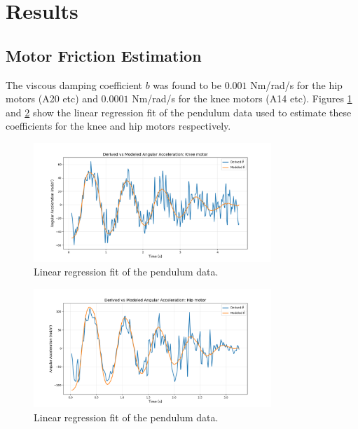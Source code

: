\section{Results}

\subsection{Motor Friction Estimation}
The viscous damping coefficient \( b \) was found to be \( 0.001 \) Nm/rad/s for the hip motors (A20 etc) and \( 0.0001 \) Nm/rad/s for the knee motors (A14 etc). Figures \ref{fig:results:motor_friction_estimation:linear_regression_knee_motor} and \ref{fig:results:motor_friction_estimation:linear_regression_hip_motor} show the linear regression fit of the pendulum data used to estimate these coefficients for the knee and hip motors respectively.

\begin{figure}[h]
    \centering
    \includegraphics[width=0.8\textwidth]{Images/results/friction_est_knee_motor.png}
    \caption{Linear regression fit of the pendulum data. }
    \label{fig:results:motor_friction_estimation:linear_regression_knee_motor}
\end{figure}

\begin{figure}[h]
    \centering
    \includegraphics[width=0.8\textwidth]{Images/results/friction_est_hip_motor.png}
    \caption{Linear regression fit of the pendulum data. }
    \label{fig:results:motor_friction_estimation:linear_regression_hip_motor}
\end{figure}







